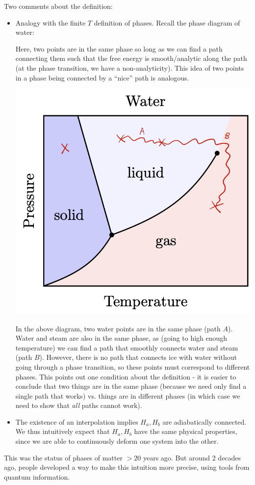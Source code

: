 Two comments about the definition:
\begin{itemize}
    \item Analogy with the finite $T$ definition of phases. Recall the phase diagram of water:

    Here, two points are in the same phase so long as we can find a path connecting them such that the free energy is smooth/analytic along the path (at the phase transition, we have a non-analyticity). This idea of two points in a phase being connected by a ``nice'' path is analogous.

    \begin{center}
        \includegraphics[scale=0.35]{Lectures/Images/lec11-water.png}
    \end{center}

    In the above diagram, two water points are in the same phase (path $A$). Water and steam are also in the same phase, as (going to high enough temperature) we can find a path that smoothly connects water and steam (path $B$). However, there is no path that connects ice with water without going through a phase transition, so these points must correspond to different phases. This points out one condition about the definition - it is easier to conclude that two things are in the same phase (because we need only find a single path that works) vs. things are in different phases (in which case we need to show that \emph{all} paths cannot work).
    \item The existence of an interpolation implies $H_a, H_b$ are adiabatically connected. We thus intuitively expect that $H_a, H_b$ have the same physical properties, since we are able to continuously deform one system into the other.
\end{itemize}
This was the status of phases of matter $> 20$ years ago. But around 2 decades ago, people developed a way to make this intuition more precise, using tools from quantum information.

